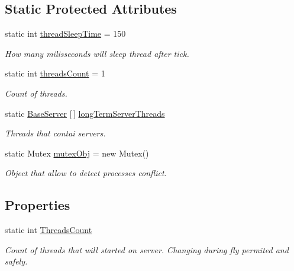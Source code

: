 \subsection*{Static Protected Attributes}
\begin{DoxyCompactItemize}
\item 
static int \mbox{\hyperlink{class_uniform_server_1_1_base_server_a4dbe04636a763decfae22ddb2fe26c7a}{thread\+Sleep\+Time}} = 150
\begin{DoxyCompactList}\small\item\em How many milisseconds will sleep thread after tick. \end{DoxyCompactList}\item 
static int \mbox{\hyperlink{class_uniform_server_1_1_base_server_aa40c02a1eec7eda4c36a8ac08119b414}{threads\+Count}} = 1
\begin{DoxyCompactList}\small\item\em Count of threads. \end{DoxyCompactList}\item 
static \mbox{\hyperlink{class_uniform_server_1_1_base_server}{Base\+Server}} \mbox{[}$\,$\mbox{]} \mbox{\hyperlink{class_uniform_server_1_1_base_server_a9c14e919da0c2b9b7f8e57a92c9b0742}{long\+Term\+Server\+Threads}}
\begin{DoxyCompactList}\small\item\em Threads that contai servers. \end{DoxyCompactList}\item 
static Mutex \mbox{\hyperlink{class_uniform_server_1_1_base_server_a051bdce3aec037df76d8efe3b9938198}{mutex\+Obj}} = new Mutex()
\begin{DoxyCompactList}\small\item\em Object that allow to detect processes conflict. \end{DoxyCompactList}\end{DoxyCompactItemize}
\subsection*{Properties}
\begin{DoxyCompactItemize}
\item 
static int \mbox{\hyperlink{class_uniform_server_1_1_base_server_a31cc7d436bb2dd344ec275fd0fa0061e}{Threads\+Count}}
\begin{DoxyCompactList}\small\item\em Count of threads that will started on server. Changing during fly permited and safely. \end{DoxyCompactList}\end{DoxyCompactItemize}
